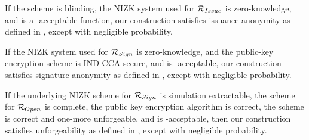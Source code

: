\begin{theorem}
  \label{thm:issue-anonymity-uas}
  If the \SBCM scheme is blinding, the NIZK system used for $\mathcal{R}_{Issue}$ 
  is zero-knowledge, and \fissue is a \UAS-acceptable function, our \CUASGen
  construction satisfies issuance anonymity as defined in
  , except with negligible probability.
\end{theorem}

\begin{theorem}
  \label{thm:sign-anonymity-uas}
  If the NIZK system used for $\mathcal{R}_{Sign}$ is zero-knowledge, and the
  public-key encryption scheme is IND-CCA secure, and \fissue is
  \UAS-acceptable, our \CUASGen construction
  satisfies signature anonymity as defined in ,
  except with negligible probability.
\end{theorem}



\begin{theorem}
  \label{thm:forge-uas}
  If the underlying NIZK scheme for $\mathcal{R}_{Sign}$ is simulation
  extractable, the scheme for $\mathcal{R}_{Open}$ is complete, the public key
  encryption algorithm is correct, the \SBCM scheme is correct and one-more
  unforgeable, and \fissue is \UAS-acceptable, then our \CUASGen construction
  satisfies unforgeability as defined in , except
  with negligible probability.
\end{theorem}

